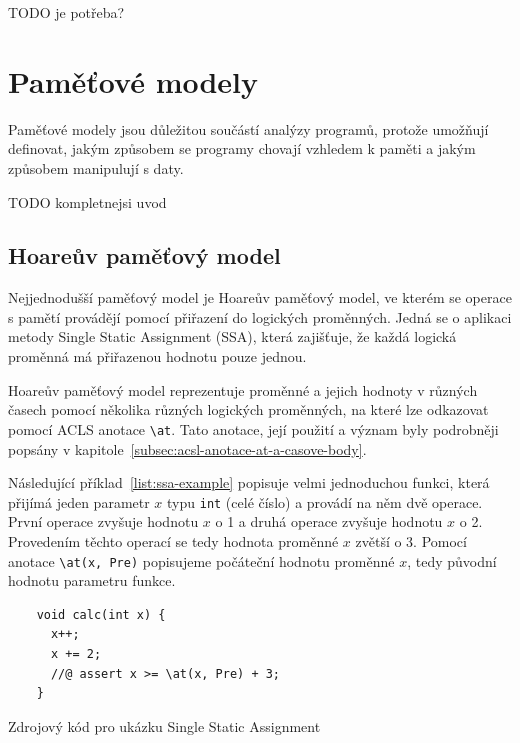 TODO je potřeba?

\section{Paměťové modely}
\label{sec:frama-c-pametove-modely}


Paměťové modely jsou důležitou součástí analýzy programů,
protože umožňují definovat, jakým způsobem se programy chovají
vzhledem k paměti a jakým způsobem manipulují s daty.

TODO kompletnejsi uvod

\subsection{Hoareův paměťový model}
\label{subsec:hoareuv-pametovy-model}

Nejjednodušší paměťový model je Hoareův paměťový model,
ve kterém se operace s pamětí provádějí pomocí přiřazení do logických proměnných.
Jedná se o aplikaci metody Single Static Assignment (SSA),
která zajišťuje, že každá logická proměnná má přiřazenou hodnotu pouze jednou.

Hoareův paměťový model reprezentuje proměnné a jejich hodnoty v různých časech
pomocí několika různých logických proměnných, na které lze odkazovat pomocí
ACLS anotace \texttt{\textbackslash at}.
Tato anotace, její použití a význam byly podrobněji popsány v kapitole~\ref{subsec:acsl-anotace-at-a-casove-body}.

Následující příklad~\ref{list:ssa-example} popisuje velmi jednoduchou funkci,
která přijímá jeden parametr $x$ typu \texttt{int} (celé číslo) a provádí na něm dvě operace.
První operace zvyšuje hodnotu $x$ o 1 a druhá operace zvyšuje hodnotu $x$ o 2.
Provedením těchto operací se tedy hodnota proměnné $x$ zvětší o 3.
Pomocí anotace \texttt{\textbackslash at(x, Pre)} popisujeme počáteční hodnotu proměnné $x$,
tedy původní hodnotu parametru funkce.

\begin{listing}[H]
    \begin{verbatim}
    void calc(int x) {
      x++;
      x += 2;
      //@ assert x >= \at(x, Pre) + 3;
    }
    \end{verbatim}
    \caption{Zdrojový kód pro ukázku Single Static Assignment}
    \label{list:ssa-example}
\end{listing}

